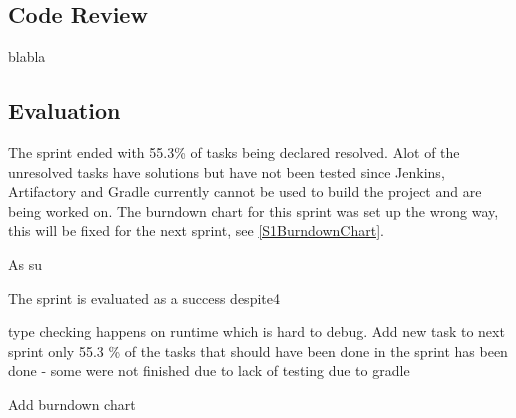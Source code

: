 \subsection{Code Review}
blabla



\subsection{Evaluation}

The sprint ended with 55.3\% of tasks being declared resolved. Alot of the
unresolved tasks have solutions but have not been tested since Jenkins,
Artifactory and Gradle currently cannot be used to build the project and are
being worked on. The burndown chart for this sprint was set up the wrong way,
this will be fixed for the next sprint, see \autoref{S1BurndownChart}.


As su


The sprint is evaluated as a success despite4


type checking happens on runtime which is hard to debug.
Add new task to next sprint
only 55.3 \% of the tasks that should have been done in the sprint has been
done - some were not finished due to lack of testing due to gradle

Add burndown chart


